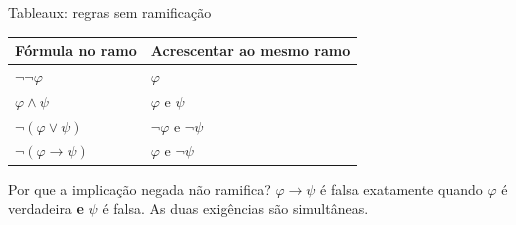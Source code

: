 \documentclass[10pt,aspectratio=169]{beamer}
\begin{document}
\begin{frame}{Tableaux: regras sem ramificação}

\small
\renewcommand{\arraystretch}{1.65}
\begin{center}
\begin{tabular}{ll}
\toprule
Fórmula no ramo & Acrescentar ao mesmo ramo\\\midrule
$\neg\neg\varphi$ & $\varphi$\\
$\varphi\land\psi$ & $\varphi$ e $\psi$\\
$\neg(\varphi\lor\psi)$ & $\neg\varphi$ e $\neg\psi$\\
$\neg(\varphi\to\psi)$ & $\varphi$ e $\neg\psi$\\\bottomrule
\end{tabular}\par
\end{center}
\begin{block}{Por que a implicação negada não ramifica?}
$\varphi\to\psi$ é falsa exatamente quando $\varphi$ é verdadeira \textbf{e} $\psi$ é falsa. As duas exigências são simultâneas.
\end{block}
\end{frame}
\end{document}
